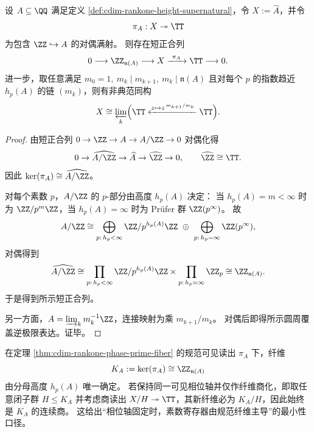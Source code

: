 \begin{theorem}\label{thm:cdim-rankone-phase-prime-fiber}
设 \(A\subseteq \QQ\) 满足定义 \ref{def:cdim-rankone-height-supernatural}，令 \(X:=\widehat A\)，并令
\[
\pi_A:X\twoheadrightarrow \TT
\]
为包含 \(\ZZ\hookrightarrow A\) 的对偶满射。
则存在短正合列
\[
0\longrightarrow \ZZ_{\mathfrak n(A)}
\longrightarrow X
\xrightarrow{\ \pi_A\ }
\TT
\longrightarrow 0.
\]
进一步，取任意满足 \(m_0=1,\ m_k\mid m_{k+1},\ m_k\mid\mathfrak n(A)\) 且对每个 \(p\) 的指数趋近 \(h_p(A)\) 的链 \((m_k)\)，则有非典范同构
\[
X\cong
\varprojlim_{k}
\Bigl(
\TT\xleftarrow{z\mapsto z^{\,m_{k+1}/m_k}}\TT
\Bigr).
\]
\end{theorem}
\begin{proof}
由短正合列 \(0\to\ZZ\to A\to A/\ZZ\to 0\) 对偶化得
\[
0\to \widehat{A/\ZZ}\to \widehat A\to \widehat\ZZ\to 0,
\qquad
\widehat\ZZ\cong\TT.
\]
因此 \(\ker(\pi_A)\cong\widehat{A/\ZZ}\)。

对每个素数 \(p\)，\(A/\ZZ\) 的 \(p\)-部分由高度 \(h_p(A)\) 决定：
当 \(h_p(A)=m<\infty\) 时为 \(\ZZ/p^m\ZZ\)，当 \(h_p(A)=\infty\) 时为 Prüfer 群 \(\ZZ(p^\infty)\)。
故
\[
A/\ZZ\cong
\bigoplus_{p:\,h_p<\infty}\ZZ/p^{h_p(A)}\ZZ
\ \oplus\
\bigoplus_{p:\,h_p=\infty}\ZZ(p^\infty),
\]
对偶得到
\[
\widehat{A/\ZZ}\cong
\prod_{p:\,h_p<\infty}\ZZ/p^{h_p(A)}\ZZ
\times
\prod_{p:\,h_p=\infty}\ZZ_p
\cong
\ZZ_{\mathfrak n(A)}.
\]
于是得到所示短正合列。

另一方面，\(A=\varinjlim_k m_k^{-1}\ZZ\)，连接映射为乘 \(m_{k+1}/m_k\)。
对偶后即得所示圆周覆盖逆极限表达。证毕。
\end{proof}

\begin{remark}[规范纤维的商最小性]\label{rem:cdim-rankone-register-minimality}
在定理 \ref{thm:cdim-rankone-phase-prime-fiber} 的规范可见读出 \(\pi_A\) 下，纤维
\[
K_A:=\ker(\pi_A)\cong \ZZ_{\mathfrak n(A)}
\]
由分母高度 \(h_p(A)\) 唯一确定。
若保持同一可见相位轴并仅作纤维商化，即取任意闭子群 \(H\le K_A\) 并考虑商读出 \(X/H\twoheadrightarrow\TT\)，其新纤维必为 \(K_A/H\)，因此始终是 \(K_A\) 的连续商。
这给出“相位轴固定时，素数寄存器由规范纤维主导”的最小性口径。
\end{remark}

